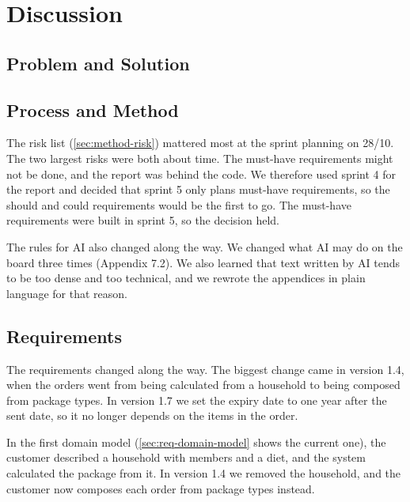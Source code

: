 \chapter{Discussion}\label{ch:discussion}

\section{Problem and Solution}\label{sec:disc-problem}

\section{Process and Method}\label{sec:disc-process}

The risk list (\autoref{sec:method-risk}) mattered most at the sprint planning on 28/10.
The two largest risks were both about time. The must-have requirements might not be
done, and the report was behind the code. We therefore used sprint 4 for the report and
decided that sprint 5 only plans must-have requirements, so the should and could
requirements would be the first to go. The must-have requirements were built in
sprint 5, so the decision held.

The rules for AI also changed along the way. We changed what AI may do on the board
three times (Appendix 7.2). We also learned that text written by AI tends to be too
dense and too technical, and we rewrote the appendices in plain language for that
reason.

\section{Requirements}\label{sec:disc-requirements}

The requirements changed along the way. The biggest change came in version 1.4, when
the orders went from being calculated from a household to being composed from package
types. In version 1.7 we set the expiry date to one year after the sent date, so it no
longer depends on the items in the order.

In the first domain model (\autoref{sec:req-domain-model} shows the current one), the customer described a household with members and a diet,
and the system calculated the package from it. In version 1.4 we removed the household,
and the customer now composes each order from package types instead.

